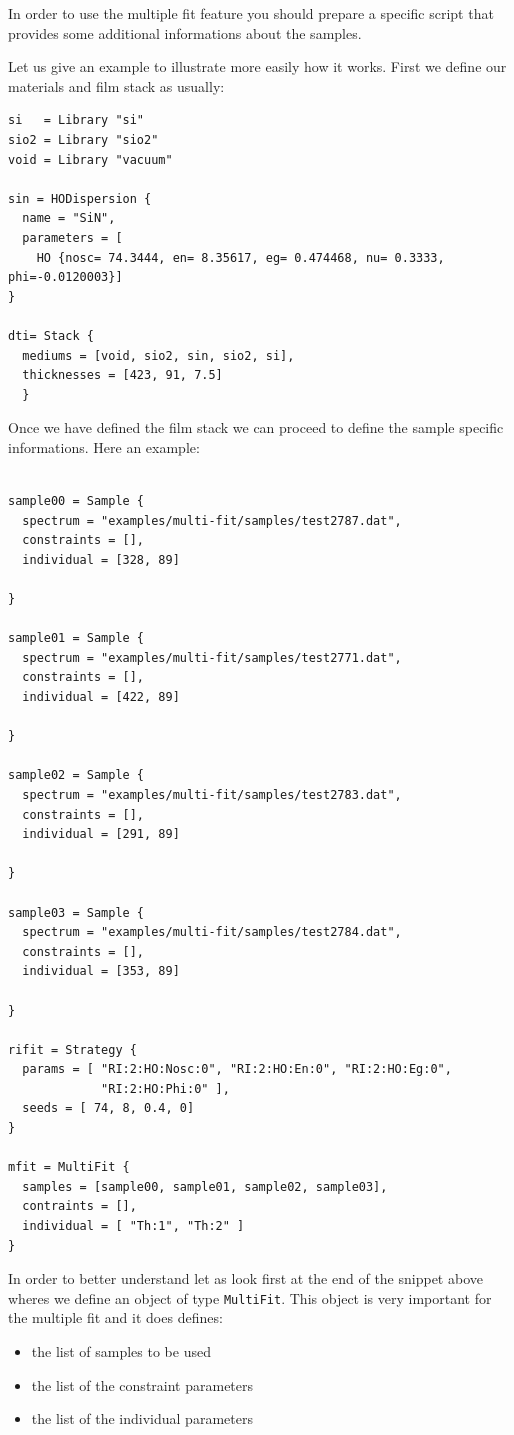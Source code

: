 \documentclass[a4paper]{report}
\begin{document}
In order to use the multiple fit feature you should prepare a specific script that provides some additional informations about the samples.

Let us give an example to illustrate more easily how it works. First we define our materials and film stack as usually:
\begin{verbatim}
si   = Library "si"
sio2 = Library "sio2"
void = Library "vacuum"

sin = HODispersion {
  name = "SiN",
  parameters = [
    HO {nosc= 74.3444, en= 8.35617, eg= 0.474468, nu= 0.3333, phi=-0.0120003}]
}

dti= Stack {
  mediums = [void, sio2, sin, sio2, si],
  thicknesses = [423, 91, 7.5]
  }
\end{verbatim}
Once we have defined the film stack we can proceed to define the sample specific informations. Here an example:

\begin{verbatim}

sample00 = Sample {
  spectrum = "examples/multi-fit/samples/test2787.dat",
  constraints = [],
  individual = [328, 89]

}

sample01 = Sample {
  spectrum = "examples/multi-fit/samples/test2771.dat",
  constraints = [],
  individual = [422, 89]

}

sample02 = Sample {
  spectrum = "examples/multi-fit/samples/test2783.dat",
  constraints = [],
  individual = [291, 89]

}

sample03 = Sample {
  spectrum = "examples/multi-fit/samples/test2784.dat",
  constraints = [],
  individual = [353, 89]

}

rifit = Strategy {
  params = [ "RI:2:HO:Nosc:0", "RI:2:HO:En:0", "RI:2:HO:Eg:0",
             "RI:2:HO:Phi:0" ],
  seeds = [ 74, 8, 0.4, 0]
}

mfit = MultiFit {
  samples = [sample00, sample01, sample02, sample03],
  contraints = [],
  individual = [ "Th:1", "Th:2" ]    
}
\end{verbatim}

In order to better understand let as look first at the end of the snippet above wheres we define an object of type \texttt{MultiFit}. This object is very important for the multiple fit and it does defines:
\begin{itemize}
  \item the list of samples to be used
  \item the list of the constraint parameters
  \item the list of the individual parameters
\end{itemize}
\end{document}
